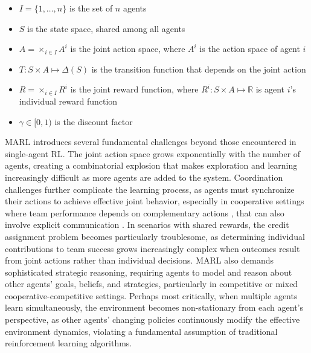 \documentclass[a4paper,12pt]{report}
\begin{document}
\begin{itemize}
    \item $I = \{1, \ldots, n\}$ is the set of $n$ agents
    \item $S$ is the state space, shared among all agents
    \item $A = \times_{i \in I} A^i$ is the joint action space, where $A^i$ is the action space of agent $i$
    \item $T: S \times A \mapsto \Delta(S)$ is the transition function that depends on the joint action
    \item $R = \times_{i \in I} R^i$ is the joint reward function, where $R^i: S \times A \mapsto \mathbb{R}$ is agent $i$'s individual reward function
    \item $\gamma \in [0, 1)$ is the discount factor
\end{itemize}
MARL introduces several fundamental challenges beyond those encountered in single-agent RL. The joint action space grows exponentially with the number of agents, creating a combinatorial explosion that makes exploration and learning increasingly difficult as more agents are added to the system. Coordination challenges further complicate the learning process, as agents must synchronize their actions to achieve effective joint behavior, especially in cooperative settings where team performance depends on complementary actions \cite{du2023reviewcooperationmultiagentlearning}, that can also involve explicit communication \cite{zhu2024surveymultiagentdeepreinforcement}. In scenarios with shared rewards, the credit assignment problem becomes particularly troublesome, as determining individual contributions to team success grows increasingly complex when outcomes result from joint actions rather than individual decisions. MARL also demands sophisticated strategic reasoning, requiring agents to model and reason about other agents' goals, beliefs, and strategies, particularly in competitive or mixed cooperative-competitive settings. Perhaps most critically, when multiple agents learn simultaneously, the environment becomes non-stationary from each agent's perspective, as other agents' changing policies continuously modify the effective environment dynamics, violating a fundamental assumption of traditional reinforcement learning algorithms.
\end{document}
